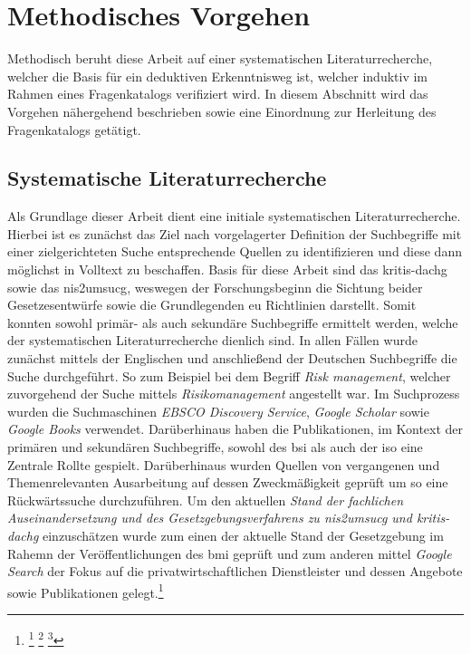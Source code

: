 \documentclass[11pt,a4paper,hidelinks]{article}   %
\begin{document}
    \section{Methodisches Vorgehen}
        Methodisch beruht diese Arbeit auf einer systematischen Literaturrecherche, welcher die Basis für ein deduktiven Erkenntnisweg ist, welcher induktiv im Rahmen eines Fragenkatalogs verifiziert wird. In diesem Abschnitt wird das Vorgehen nähergehend beschrieben sowie eine Einordnung zur Herleitung des Fragenkatalogs getätigt.
        \subsection{Systematische Literaturrecherche}
            Als Grundlage dieser Arbeit dient eine initiale systematischen Literaturrecherche. Hierbei ist es zunächst das Ziel nach vorgelagerter Definition der Suchbegriffe mit einer zielgerichteten Suche entsprechende Quellen zu identifizieren und diese dann möglichst in Volltext zu beschaffen. Basis für diese Arbeit sind das \gls{kritis-dachg} sowie das \gls{nis2umsucg}, weswegen der Forschungsbeginn die Sichtung beider Gesetzesentwürfe sowie die Grundlegenden \gls{eu} Richtlinien darstellt. Somit konnten sowohl primär- als auch sekundäre Suchbegriffe ermittelt werden, welche der systematischen Literaturrecherche dienlich sind. In allen Fällen wurde zunächst mittels der Englischen und anschließend der Deutschen Suchbegriffe die Suche durchgeführt. So zum Beispiel bei dem Begriff \emph{Risk management}, welcher zuvorgehend der Suche mittels \emph{Risikomanagement} angestellt war. Im Suchprozess wurden die Suchmaschinen \emph{EBSCO Discovery Service}, \emph{Google Scholar} sowie \emph{Google Books} verwendet. Darüberhinaus haben die Publikationen, im Kontext der primären und sekundären Suchbegriffe, sowohl des \gls{bsi} als auch der \gls{iso} eine Zentrale Rollte gespielt. Darüberhinaus wurden Quellen von vergangenen und Themenrelevanten Ausarbeitung auf dessen Zweckmäßigkeit geprüft um so eine Rückwärtssuche durchzuführen. Um den aktuellen \emph{Stand der fachlichen Auseinandersetzung und des Gesetzgebungsverfahrens zu \gls{nis2umsucg} und \gls{kritis-dachg}} einzuschätzen wurde zum einen der aktuelle Stand der Gesetzgebung im Rahemn der Veröffentlichungen des \gls{bmi} geprüft und zum anderen mittel \emph{Google Search} der Fokus auf die privatwirtschaftlichen Dienstleister und dessen Angebote sowie Publikationen gelegt.\footnote{
                \footcite[Vgl. S. 163 - 167][]{9783662647622}
                \footcite[Vgl. S. 215 - 216, 218 - 220][]{10.17705-1CAIS.03709}
                \footcite[Vgl.][S. 81 – 58, 298 – 299]{9783825250843}
            }
\end{document}
